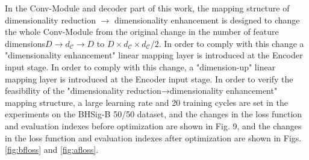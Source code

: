 In the Conv-Module and decoder part of this work, the mapping structure of dimensionality reduction $\to$ dimensionality enhancement is designed to change the whole Conv-Module from the original change in the number of feature dimensions$ D → d_\mathcal{C} \to D$ to $D \times d_\mathcal{C} \times d_\mathcal{C}/2$. In order to comply with this change a "dimensionality enhancement" linear mapping layer is introduced at the Encoder input stage. In order to comply with this change, a "dimension-up" linear mapping layer is introduced at the Encoder input stage. In order to verify the feasibility of the "dimensionality reduction→dimensionality enhancement" mapping structure, a large learning rate and 20 training cycles are set in the experiments on the BHSig-B 50/50 dataset, and the changes in the loss function and evaluation indexes before optimization are shown in Fig. 9, and the changes in the loss function and evaluation indexes after optimization are shown in Figs. \ref{fig:bfloss} and \ref{fig:afloss}.


